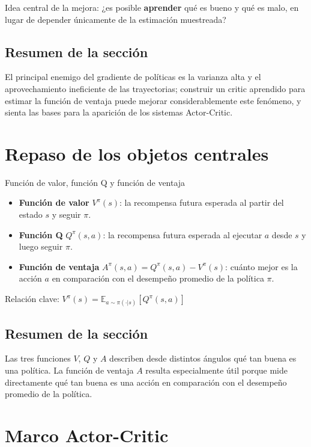 \documentclass[a4paper]{article}
\begin{document}
Idea central de la mejora: ¿es posible \textbf{aprender} qué es bueno y qué es malo, en lugar de depender únicamente de la estimación muestreada?

\subsection{Resumen de la sección}

El principal enemigo del gradiente de políticas es la varianza alta y el aprovechamiento ineficiente de las trayectorias; construir un critic aprendido para estimar la función de ventaja puede mejorar considerablemente este fenómeno, y sienta las bases para la aparición de los sistemas Actor-Critic.

\section{Repaso de los objetos centrales}

\begin{importantbox}{Función de valor, función Q y función de ventaja}
\begin{itemize}
    \item \textbf{Función de valor} $V^\pi(s)$: la recompensa futura esperada al partir del estado $s$ y seguir $\pi$.
    \item \textbf{Función Q} $Q^\pi(s, a)$: la recompensa futura esperada al ejecutar $a$ desde $s$ y luego seguir $\pi$.
    \item \textbf{Función de ventaja} $A^\pi(s, a) = Q^\pi(s, a) - V^\pi(s)$: cuánto mejor es la acción $a$ en comparación con el desempeño promedio de la política $\pi$.
\end{itemize}
Relación clave: $V^\pi(s) = \mathbb{E}_{a \sim \pi(\cdot|s)}\left[Q^\pi(s, a)\right]$
\end{importantbox}

\subsection{Resumen de la sección}

Las tres funciones $V$, $Q$ y $A$ describen desde distintos ángulos qué tan buena es una política. La función de ventaja $A$ resulta especialmente útil porque mide directamente qué tan buena es una acción en comparación con el desempeño promedio de la política.
\section{Marco Actor-Critic}
\end{document}

